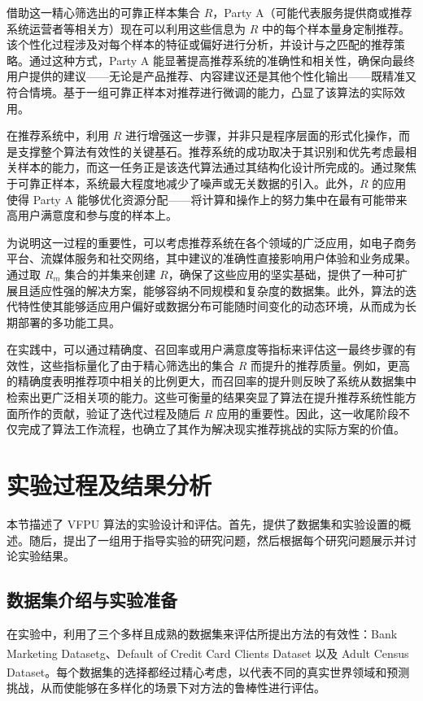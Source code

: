借助这一精心筛选出的可靠正样本集合 $R$，Party A（可能代表服务提供商或推荐系统运营者等相关方）现在可以利用这些信息为 $R$ 中的每个样本量身定制推荐。该个性化过程涉及对每个样本的特征或偏好进行分析，并设计与之匹配的推荐策略。通过这种方式，Party A 能显著提高推荐系统的准确性和相关性，确保向最终用户提供的建议——无论是产品推荐、内容建议还是其他个性化输出——既精准又符合情境。基于一组可靠正样本对推荐进行微调的能力，凸显了该算法的实际效用。

在推荐系统中，利用 $R$ 进行增强这一步骤，并非只是程序层面的形式化操作，而是支撑整个算法有效性的关键基石。推荐系统的成功取决于其识别和优先考虑最相关样本的能力，而这一任务正是该迭代算法通过其结构化设计所完成的。通过聚焦于可靠正样本，系统最大程度地减少了噪声或无关数据的引入。此外，$R$ 的应用使得 Party A 能够优化资源分配——将计算和操作上的努力集中在最有可能带来高用户满意度和参与度的样本上。

为说明这一过程的重要性，可以考虑推荐系统在各个领域的广泛应用，如电子商务平台、流媒体服务和社交网络，其中建议的准确性直接影响用户体验和业务成果。通过取 ${{R}_{m}}$ 集合的并集来创建 $R$，确保了这些应用的坚实基础，提供了一种可扩展且适应性强的解决方案，能够容纳不同规模和复杂度的数据集。此外，算法的迭代特性使其能够适应用户偏好或数据分布可能随时间变化的动态环境，从而成为长期部署的多功能工具。

在实践中，可以通过精确度、召回率或用户满意度等指标来评估这一最终步骤的有效性，这些指标量化了由于精心筛选出的集合 $R$ 而提升的推荐质量。例如，更高的精确度表明推荐项中相关的比例更大，而召回率的提升则反映了系统从数据集中检索出更广泛相关项的能力。这些可衡量的结果突显了算法在提升推荐系统性能方面所作的贡献，验证了迭代过程及随后 $R$ 应用的重要性。因此，这一收尾阶段不仅完成了算法工作流程，也确立了其作为解决现实推荐挑战的实际方案的价值。  

\section{实验过程及结果分析}
本节描述了 VFPU 算法的实验设计和评估。首先，提供了数据集和实验设置的概述。随后，提出了一组用于指导实验的研究问题，然后根据每个研究问题展示并讨论实验结果。
\subsection{数据集介绍与实验准备}
在实验中，利用了三个多样且成熟的数据集来评估所提出方法的有效性：Bank Marketing Datasetg\textsuperscript{\cite{fitriani2021data}}、Default of Credit Card Clients Dataset\textsuperscript{\cite{subasi2019prediction}} 以及 Adult Census Dataset\textsuperscript{\cite{chakrabarty2018statistical}}。每个数据集的选择都经过精心考虑，以代表不同的真实世界领域和预测挑战，从而使能够在多样化的场景下对方法的鲁棒性进行评估。

